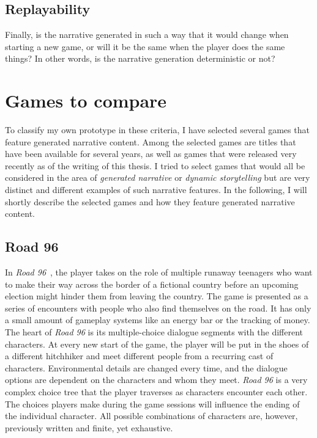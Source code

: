 \subsection{Replayability}
Finally, is the narrative generated in such a way that it would change when starting a new game, or will it be the same when the player does the same things? In other words, is the narrative generation deterministic or not?
\section{Games to compare}
To classify my own prototype in these criteria, I have selected several games that feature generated narrative content. Among the selected games are titles that have been available for several years, as well as games that were released very recently as of the writing of this thesis. I tried to select games that would all be considered in the area of \textit{generated narrative} or \textit{dynamic storytelling} but are very distinct and different examples of such narrative features. In the following, I will shortly describe the selected games and how they feature generated narrative content.
\subsection{Road 96}
In \textit{Road 96}~\cite{road}, the player takes on the role of multiple runaway teenagers who want to make their way across the border of a fictional country before an upcoming election might hinder them from leaving the country. The game is presented as a series of encounters with people who also find themselves on the road. It has only a small amount of gameplay systems like an energy bar or the tracking of money.\\
The heart of \textit{Road 96} is its multiple-choice dialogue segments with the different characters. At every new start of the game, the player will be put in the shoes of a different hitchhiker and meet different people from a recurring cast of characters. Environmental details are changed every time, and the dialogue options are dependent on the characters and whom they meet. \textit{Road 96} is a very complex choice tree that the player traverses as characters encounter each other. The choices players make during the game sessions will influence the ending of the individual character. All possible combinations of characters are, however, previously written and finite, yet exhaustive.

